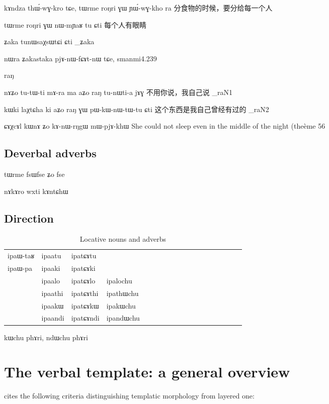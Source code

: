 \documentclass[oldfontcommands,oneside,a4paper,11pt]{memoir}
\newcommand{\ipa}[1]{{\phon #1}} %
\newcommand{\wav}[1]{}%
\begin{document}
\xv kɤndza thɯ́-wɣ-kro tɕe, tɯrme roŋri ɣɯ ɲɯ́-wɣ-kho ra
\xn 分食物的时候，要分给每一个人

\xv tɯrme roŋri ɣɯ nɯ-mɲaʁ tu ɕti
\xn 每个人有眼睛

\xv ʑaka tunɯsaχsɯtɕi ɕti
\ipa{8_ʑaka}

nɯra ʑakastaka pjɤ-nɯ-fɕɤt-nɯ tɕe, 
smanmi4.239




\ipa{raŋ}

\xv nɤʑo tu-tɯ-ti mɤ-ra ma aʑo raŋ tu-nɯti-a jɤɣ
\xn 不用你说，我自己说
\ipa{8_raN1}

\xv kɯki laχtɕha ki aʑo raŋ ɣɯ pɯ-kɯ-nɯ-tɯ-tu ɕti
\xn 这个东西是我自己曾经有过的
\ipa{8_raN2}


ɕɤχcɤl kɯnɤ ʑo kɤ-nɯ-rŋgɯ mɯ-pjɤ-khɯ \wav{8_CAXcAl}
She could not sleep even in the middle of the night (theème 56
\section{Deverbal adverbs}

tɯrme fsɯfse ʑo fse

nɤkɤro wxti
kɤntɕhɯ

\section{Direction}
\begin{table}[H]
\caption{Locative nouns and adverbs}\label{tab:adv.loc}
\begin{tabular}{llllllllllllllllll} \toprule
ipa{ɯ-taʁ}  &  	ipa{atu}  &  	ipa{tɕɤtu}  &  	\\
ipa{ɯ-pa}  &  	ipa{aki}  &  	ipa{tɕɤki}  &  	\\
&	ipa{alo}  &  	ipa{tɕɤlo}  &  	ipa{lochu}  \\  
&	ipa{athi}  &  	ipa{tɕɤthi}  &  	ipa{thɯchu}  \\  
&	ipa{akɯ}  &  	ipa{tɕɤkɯ}  &  	ipa{kɯchu}  \\  
&	ipa{andi}  &  	ipa{tɕɤndi}  &  	ipa{ndɯchu}  \\  
\bottomrule
\end{tabular}
\end{table}

kɯchu phɤri, ndɯchu phɤri



\chapter{The verbal template: a general overview} \label{chapt:template}
 \cite[218]{bickel07inflectional} cites the following criteria distinguishing templatic morphology from layered one: 
\end{document}
